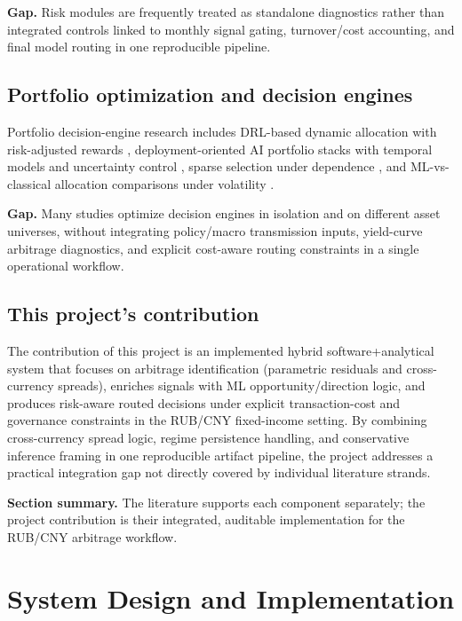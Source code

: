 \documentclass[a4paper,12pt]{extarticle}
\begin{document}
\textbf{Gap.} Risk modules are frequently treated as standalone diagnostics rather than integrated controls linked to monthly signal gating, turnover/cost accounting, and final model routing in one reproducible pipeline.

\subsection{Portfolio optimization and decision engines}

Portfolio decision-engine research includes DRL-based dynamic allocation with risk-adjusted rewards \cite{huang2024}, deployment-oriented AI portfolio stacks with temporal models and uncertainty control \cite{suratwala2025}, sparse selection under dependence \cite{machkour2025}, and ML-vs-classical allocation comparisons under volatility \cite{olanrewaju2025}.

\textbf{Gap.} Many studies optimize decision engines in isolation and on different asset universes, without integrating policy/macro transmission inputs, yield-curve arbitrage diagnostics, and explicit cost-aware routing constraints in a single operational workflow.

\subsection{This project's contribution}

The contribution of this project is an implemented hybrid software+analytical system that focuses on arbitrage identification (parametric residuals and cross-currency spreads), enriches signals with ML opportunity/direction logic, and produces risk-aware routed decisions under explicit transaction-cost and governance constraints in the RUB/CNY fixed-income setting. By combining cross-currency spread logic, regime persistence handling, and conservative inference framing in one reproducible artifact pipeline, the project addresses a practical integration gap not directly covered by individual literature strands.

\textbf{Section summary.} The literature supports each component separately; the project contribution is their integrated, auditable implementation for the RUB/CNY arbitrage workflow.

\section{System Design and Implementation}
\end{document}
